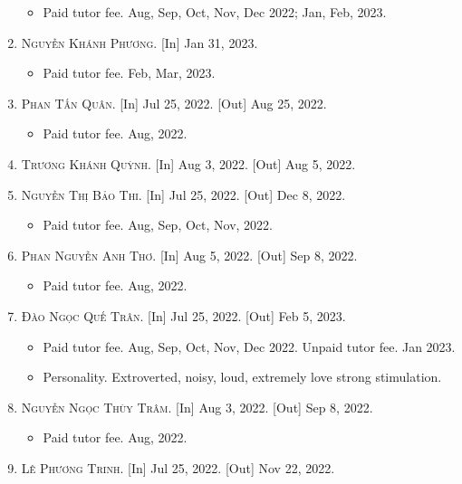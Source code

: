 \documentclass{article}
\begin{document}
\begin{enumerate}
	\begin{itemize}
		\item \textsf{Paid tutor fee.} Aug, Sep, Oct, Nov, Dec 2022; Jan, Feb, 2023.
	\end{itemize}
	\item \textsc{Nguyễn Khánh Phương.}  \textsf{[In]} Jan 31, 2023.
	\begin{itemize}
		\item \textsf{Paid tutor fee.} Feb, Mar, 2023.
	\end{itemize}
	\item \textsc{Phan Tấn Quân.} \textsf{[In]} Jul 25, 2022. \textsf{[Out]} Aug 25, 2022.
	\begin{itemize}
		\item \textsf{Paid tutor fee.} Aug, 2022.
	\end{itemize}
	\item \textsc{Trương Khánh Quỳnh.} \textsf{[In]} Aug 3, 2022. \textsf{[Out]} Aug 5, 2022.
	\item \textsc{Nguyễn Thị Bảo Thi.} \textsf{[In]} Jul 25, 2022. \textsf{[Out]} Dec 8, 2022.
	\begin{itemize}
		\item \textsf{Paid tutor fee.} Aug, Sep, Oct, Nov, 2022.
	\end{itemize}
	\item \textsc{Phan Nguyễn Anh Thơ.} \textsf{[In]} Aug 5, 2022. \textsf{[Out]} Sep 8, 2022.
	\begin{itemize}
		\item \textsf{Paid tutor fee.} Aug, 2022.
	\end{itemize}
	\item \textsc{Đào Ngọc Quế Trân.} \textsf{[In]} Jul 25, 2022. \textsf{[Out]} Feb 5, 2023.
	\begin{itemize}
		\item \textsf{Paid tutor fee.} Aug, Sep, Oct, Nov, Dec 2022. \textsf{Unpaid tutor fee.} Jan 2023.
		\item \textsf{Personality.} Extroverted, noisy, loud, extremely love strong stimulation.
	\end{itemize}
	\item \textsc{Nguyễn Ngọc Thùy Trâm.} \textsf{[In]} Aug 3, 2022. \textsf{[Out]} Sep 8, 2022.
	\begin{itemize}
		\item \textsf{Paid tutor fee.} Aug, 2022.
	\end{itemize}
	\item \textsc{Lê Phương Trinh.} \textsf{[In]} Jul 25, 2022. \textsf{[Out]} Nov 22, 2022.

\end{enumerate}
\end{document}
